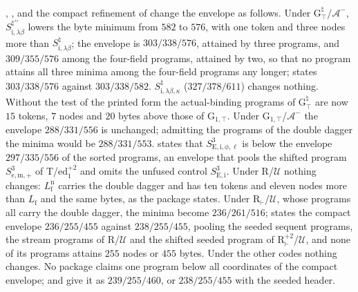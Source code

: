 , ,  and the compact refinement of
 change the envelope as follows. Under G$^{\natural}_{\top}$/$\mathcal A^{-}$,
$S^{\natural\prime\prime}_{\mathrm{i},\lambda\beta}$ lowers the byte minimum from $582$ to $576$, with one
token and three nodes more than $S^{\natural}_{\mathrm{i},\lambda\beta}$; the envelope is $303/338/576$,
attained by three programs, and $309/355/576$ among the four-field programs, attained by two, so that no
program attains all three minima among the four-field programs any longer;  states
$303/338/576$ against $303/338/582$. $S^{\natural}_{\mathrm{i},\lambda\beta,\kappa}$ ($327/378/611$) changes
nothing. Without the test of the printed form the actual-binding programs of G$^{\natural}_{\top}$ are now
$15$ tokens, $7$ nodes and $20$ bytes above those of G$_{1,\top}$. Under G$_{1,\top}$/$\mathcal A^{-}$ the
envelope $288/331/556$ is unchanged; admitting the programs of the double dagger the minima would be
$288/331/553$.  states that $S^{3}_{\mathrm{E,i},\phi,\ell}$ is below the envelope
$297/335/556$ of the sorted programs, an envelope that pools the shifted program $S^{3}_{\mathrm{e,m},+}$
of T/ed$_1^{+2}$ and omits the unfused control $S^{3}_{\mathrm{E,i}}$. Under R/$\mathcal U$ nothing
changes: $L^{\mathrm n}_{\mathrm f}$ carries the double dagger and has ten tokens and eleven nodes more
than $L_{\mathrm f}$ and the same bytes, as the package states. Under R$_{\vdash}$/$\mathcal U$, whose
programs all carry the double dagger, the minima become $236/261/516$;  states the compact
envelope $236/255/455$ against $238/255/455$, pooling the seeded sequent programs, the stream programs of
R/$\mathcal U$ and the shifted seeded program of R$^{+2}_{\vdash}$/$\mathcal U$, and none of its programs
attains $255$ nodes or $455$ bytes. Under the other codes nothing changes. No package claims one program
below all coordinates of the compact envelope;  and  give
it as $239/255/460$, or $238/255/455$ with the seeded header.

